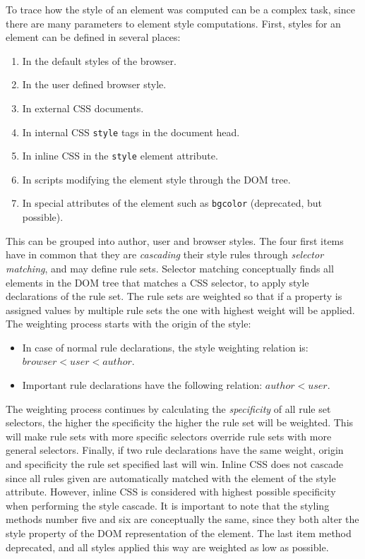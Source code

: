 \documentclass[a4paper,11pt]{kth-mag}
\newcommand{\code}[1]{\texttt{#1}}
\begin{document}
        To trace how the style of an \gls{element} was computed can be a complex task, since there are many parameters to \gls{element} style computations.
        First, styles for an \gls{element} can be defined in several places:
        \begin{enumerate}
          \item In the default styles of the \gls{browser}.
          \item In the user defined \gls{browser} style.
          \item In external \gls{CSS} \glspl{document}.
          \item In internal \gls{CSS} \code{style} tags in the \gls{document} head.
          \item In inline \gls{CSS} in the \code{style} \gls{element} attribute.
          \item In scripts modifying the \gls{element} style through the \gls{DOM} tree.
          \item In special attributes of the \gls{element} such as \code{bgcolor} (deprecated, but possible).
        \end{enumerate}
        This can be grouped into author, user and \gls{browser} styles.
        The four first items have in common that they are \emph{cascading} their style rules through \emph{selector matching}, and may define rule sets.
        Selector matching conceptually finds all \glspl{element} in the \gls{DOM} tree that matches a \gls{CSS} selector, to apply style declarations of the rule set.
        The rule sets are weighted so that if a property is assigned values by multiple rule sets the one with highest weight will be applied.
        The weighting process starts with the origin of the style:
        \begin{itemize}
          \item In case of normal rule declarations, the style weighting relation is: $browser < user < author$.
          \item Important rule declarations have the following relation: $author < user$.
        \end{itemize}
        The weighting process continues by calculating the \emph{specificity} of all rule set selectors, the higher the specificity the higher the rule set will be weighted. 
        This will make rule sets with more specific selectors override rule sets with more general selectors.
        Finally, if two rule declarations have the same weight, origin and specificity the rule set specified last will win.
        Inline \gls{CSS} does not cascade since all rules given are automatically matched with the \gls{element} of the style attribute.
        However, inline \gls{CSS} is considered with highest possible specificity when performing the style cascade.
        It is important to note that the styling methods number five and six are conceptually the same, since they both alter the style property of the \gls{DOM} representation of the \gls{element}.
        The last item method deprecated, and all styles applied this way are weighted as low as possible.
\end{document}
